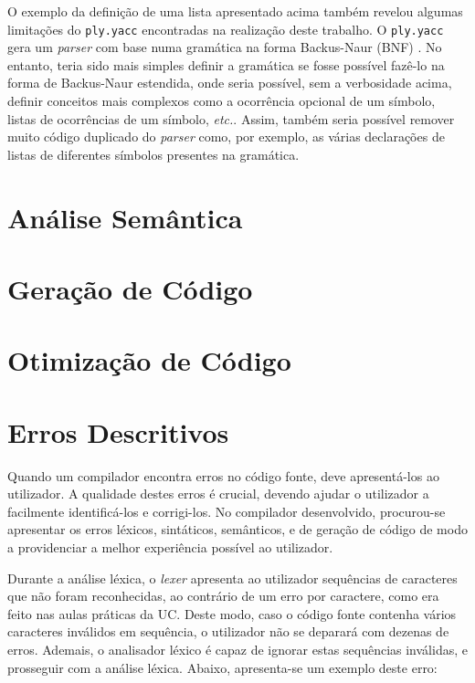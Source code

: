 \documentclass[12pt, a4paper]{article}
\begin{document}
O exemplo da definição de uma lista apresentado acima também revelou algumas limitações do
\texttt{ply.yacc} encontradas na realização deste trabalho. O \texttt{ply.yacc} gera um
\emph{parser} com base numa gramática na forma Backus-Naur (BNF) \cite{ply}. No entanto, teria sido
mais simples definir a gramática se fosse possível fazê-lo na forma de Backus-Naur estendida, onde
seria possível, sem a verbosidade acima, definir conceitos mais complexos como a ocorrência opcional
de um símbolo, listas de ocorrências de um símbolo, \emph{etc.}. Assim, também seria possível
remover muito código duplicado do \emph{parser} como, por exemplo, as várias declarações de listas
de diferentes símbolos presentes na gramática.

\section{Análise Semântica}

\section{Geração de Código}

\section{Otimização de Código}

\section{Erros Descritivos}

Quando um compilador encontra erros no código fonte, deve apresentá-los ao utilizador. A qualidade
destes erros é crucial, devendo ajudar o utilizador a facilmente identificá-los e corrigi-los. No
compilador desenvolvido, procurou-se apresentar os erros léxicos, sintáticos, semânticos, e de
geração de código de modo a providenciar a melhor experiência possível ao utilizador.

Durante a análise léxica, o \emph{lexer} apresenta ao utilizador sequências de caracteres que não
foram reconhecidas, ao contrário de um erro por caractere, como era feito nas aulas práticas da UC.
Deste modo, caso o código fonte contenha vários caracteres inválidos em sequência, o utilizador não
se deparará com dezenas de erros. Ademais, o analisador léxico é capaz de ignorar estas sequências
inválidas, e prosseguir com a análise léxica. Abaixo, apresenta-se um exemplo deste erro:
\end{document}
